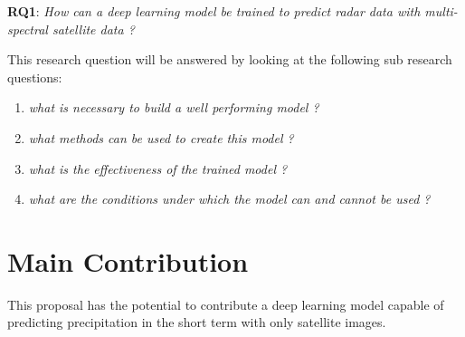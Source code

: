 \documentclass[acmtog, authorversion]{acmart}
\begin{document}



\textbf{RQ1}: \textit{How can a deep learning model be trained to predict radar data with multi-spectral satellite data ?}
\smallskip

This research question will be answered by looking at the following sub research questions:
\begin{enumerate}
    \item \textit{what is necessary to build a well performing model ?}
    \item \textit{what methods can be used to create this model ?}
    \item \textit{what is the effectiveness of the trained model ?}
    \item \textit{what are the conditions under which the model can and cannot be used ?}
\end{enumerate}

\section{Main Contribution}
This proposal has the potential to contribute a deep learning model capable of predicting precipitation in the short term with only satellite images.
\end{document}
